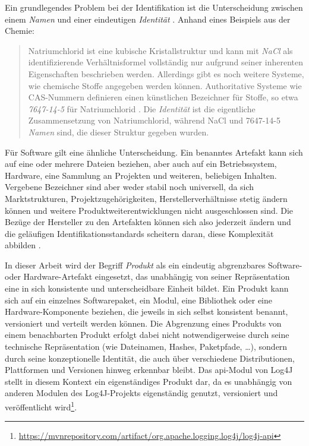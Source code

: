 Ein grundlegendes Problem bei der Identifikation ist die Unterscheidung zwischen einem \textit{Namen} und einer eindeutigen \textit{Identität} \autocite{Manion_Proell_Schmidt2023}.
Anhand eines Beispiels aus der Chemie:

\begin{quote}
    Natriumchlorid ist eine kubische Kristallstruktur und kann mit \textit{NaCl} als identifizierende Verhältnisformel vollständig nur aufgrund seiner inherenten Eigenschaften beschrieben werden.
    Allerdings gibt es noch weitere Systeme, wie chemische Stoffe angegeben werden können.
    Authoritative Systeme wie CAS-Nummern definieren einen künstlichen Bezeichner für Stoffe, so etwa \textit{7647-14-5} für Natriumchlorid \autocite{Huebner_2003}.
    Die \textit{Identität} ist die eigentliche Zusammensetzung von Natriumchlorid, während NaCl und 7647-14-5 \textit{Namen} sind, die dieser Struktur gegeben wurden.
\end{quote}

Für Software gilt eine ähnliche Unterscheidung.
Ein benanntes Artefakt kann sich auf eine oder mehrere Dateien beziehen, aber auch auf ein Betriebssystem, Hardware, eine Sammlung an Projekten und weiteren, beliebigen Inhalten.
Vergebene Bezeichner sind aber weder stabil noch universell, da sich Marktstrukturen, Projektzugehörigkeiten, Herstellerverhältnisse stetig ändern können und weitere Produktweiterentwicklungen nicht ausgeschlossen sind.
Die Bezüge der Hersteller zu den Artefakten können sich also jederzeit ändern und die geläufigen Identifikationsstandards scheitern daran, diese Komplexität abbilden \autocite{Manion_Proell_Schmidt2023}.

In dieser Arbeit wird der Begriff \textit{Produkt} als ein eindeutig abgrenzbares Software- oder Hardware-Artefakt eingesetzt, das unabhängig von seiner Repräsentation eine in sich konsistente und unterscheidbare Einheit bildet.
Ein Produkt kann sich auf ein einzelnes Softwarepaket, ein Modul, eine Bibliothek oder eine Hardware-Komponente beziehen, die jeweils in sich selbst konsistent benannt, versioniert und verteilt werden können.
Die Abgrenzung eines Produkts von einem benachbarten Produkt erfolgt dabei nicht notwendigerweise durch seine technische Repräsentation (wie Dateinamen, Hashes, Paketpfade, \ldots), sondern durch seine konzeptionelle Identität, die auch über verschiedene Distributionen, Plattformen und Versionen hinweg erkennbar bleibt.
Das \acrshort{api}-Modul von Log4J stellt in diesem Kontext ein eigenständiges Produkt dar, da es unabhängig von anderen Modulen des Log4J-Projekts eigenständig genutzt, versioniert und veröffentlicht wird\footnote{\url{https://mvnrepository.com/artifact/org.apache.logging.log4j/log4j-api}}.

